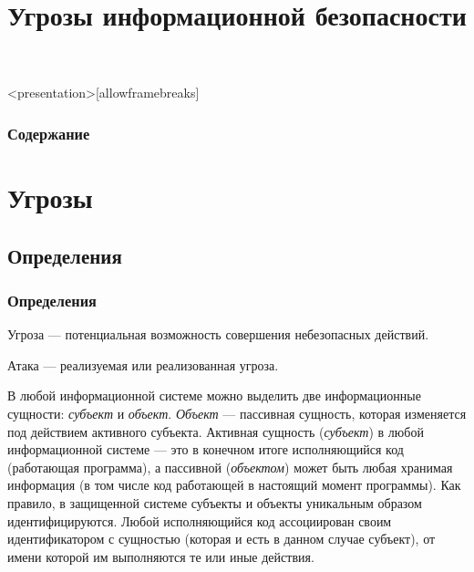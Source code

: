 


\title[Угрозы, атаки]{Угрозы информационной безопасности}






\begin{frame}<presentation>[allowframebreaks]
\frametitle{Содержание}
\tableofcontents
\end{frame}


\section{Угрозы}


\subsection{Определения}


\begin{frame}
    \frametitle{Определения}

    \begin{definition}%
        \alert{Угроза} --- потенциальная возможность совершения небезопасных действий.
    \end{definition}
    \begin{definition}%
        \alert{Атака} --- реализуемая или реализованная угроза.
    \end{definition}
\end{frame}


В любой информационной системе можно выделить две информационные сущности: \emph{субъект} и \emph{объект}. \emph{Объект} --- пассивная сущность, которая изменяется под действием активного субъекта. Активная сущность (\emph{субъект}) в любой информационной системе --- это в конечном итоге исполняющийся код (работающая программа), а пассивной (\emph{объектом}) может быть любая хранимая информация (в том числе код работающей в настоящий момент программы). Как правило, в защищенной системе субъекты и объекты уникальным образом идентифицируются. Любой исполняющийся код  ассоциирован своим идентификатором с сущностью (которая и есть в данном случае субъект), от имени которой им выполняются те или иные действия.

